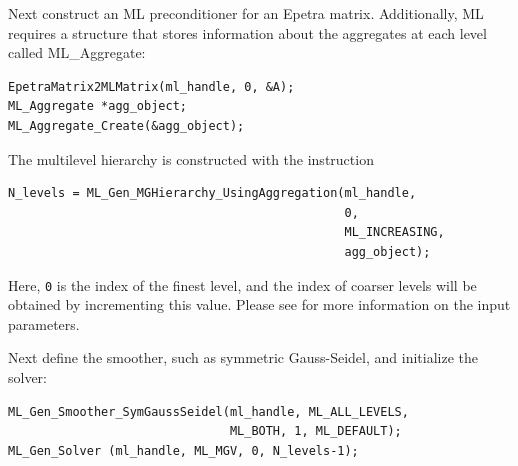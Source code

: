 Next construct an ML preconditioner for an Epetra matrix.
Additionally, ML requires a structure that stores 
information about the aggregates at each level called ML\_Aggregate:
\begin{verbatim}
EpetraMatrix2MLMatrix(ml_handle, 0, &A);
ML_Aggregate *agg_object;
ML_Aggregate_Create(&agg_object);
\end{verbatim}

The multilevel hierarchy is constructed with the instruction
\begin{verbatim}
N_levels = ML_Gen_MGHierarchy_UsingAggregation(ml_handle,
                                               0,
                                               ML_INCREASING,
                                               agg_object);
\end{verbatim}
Here, \verb!0! is the index of the finest level, and the index of
coarser levels will be obtained by incrementing this value.
Please see \cite{ML-Users-Guide} for more information on the input parameters.

Next define the smoother, such as symmetric Gauss-Seidel,
and initialize the solver:
\begin{verbatim}
ML_Gen_Smoother_SymGaussSeidel(ml_handle, ML_ALL_LEVELS,
                               ML_BOTH, 1, ML_DEFAULT);
ML_Gen_Solver (ml_handle, ML_MGV, 0, N_levels-1);
\end{verbatim}

